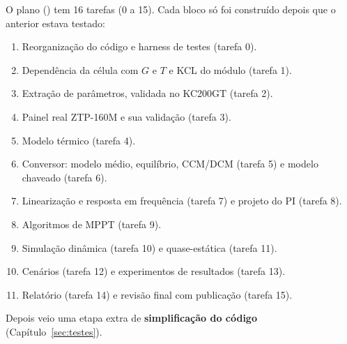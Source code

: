 O plano () tem 16 tarefas
(0 a 15). Cada bloco s\'o foi constru\'ido depois que o anterior estava testado:

\begin{enumerate}
\item Reorganiza\c{c}\~ao do c\'odigo e harness de testes (tarefa 0).
\item Depend\^encia da c\'elula com $G$ e $T$ e KCL do m\'odulo (tarefa 1).
\item Extra\c{c}\~ao de par\^ametros, validada no KC200GT (tarefa 2).
\item Painel real ZTP-160M e sua valida\c{c}\~ao (tarefa 3).
\item Modelo t\'ermico (tarefa 4).
\item Conversor: modelo m\'edio, equil\'ibrio, CCM/DCM (tarefa 5) e modelo chaveado (tarefa 6).
\item Lineariza\c{c}\~ao e resposta em frequ\^encia (tarefa 7) e projeto do PI (tarefa 8).
\item Algoritmos de MPPT (tarefa 9).
\item Simula\c{c}\~ao din\^amica (tarefa 10) e quase-est\'atica (tarefa 11).
\item Cen\'arios (tarefa 12) e experimentos de resultados (tarefa 13).
\item Relat\'orio (tarefa 14) e revis\~ao final com publica\c{c}\~ao (tarefa 15).
\end{enumerate}

Depois veio uma etapa extra de \textbf{simplifica\c{c}\~ao do c\'odigo} (Cap\'itulo~\ref{sec:testes}).
